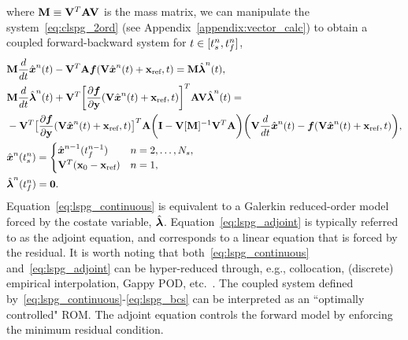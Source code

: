 where
$\massArgnt{n} \equiv \basisspace^T \stweightingMatArgt{n}{t} \basisspace$ is the
mass matrix,
we can manipulate the system~\eqref{eq:clspg_2ord} (see
Appendix~\ref{appendix:vector_calc}) to obtain a coupled forward-backward
system for $t \in  [\timeStartArg{n},\timeEndArg{n}]$,
\begin{align}\label{eq:lspg_continuous} 
&\mass  \frac{d}{dt} \genstateArg{n}{t}  -  \basisspace^T
\stweightingMatArgt{n}{t} \velocity(\veloargsromn) =  \mass \adjointArg{n}{t} , \\
 &\mass \frac{d}{dt} \adjointArg{n}{t}  + \basisspace^T \bigg[\frac{\partial
\velocity}{\partial \stateyDiscrete} (\basisspace \genstateArg{n}{t} +
\stateIntercept,t) \bigg]^T \stweightingMatArgt{n}{t} \basisspace
 \adjointArg{n}{t} = \nonumber \\ &-\basisspace^T \big[
\frac{\partial \velocity}{\partial \stateyDiscrete}(\basisspace \genstateArg{n}{t} +
\stateIntercept,t) \big]^T \stweightingMatArgt{n}{t} \bigg( \mathbf{I} -
\basisspace [\massArgnt{n}]^{-1} \basisspace^T \stweightingMatArgt{n}{t} \bigg)
 \bigg( \basisspace \frac{d}{dt}\genstateArg{n}{t}  -
\velocity(\veloargsromn) \bigg), \label{eq:lspg_adjoint} \\ &
\genstateArg{n}{\timeStartArg{n}} = \begin{cases}
\genstate^{n-1}(\timeEndArg{n-1}) & n=2,\ldots,\nslabs, \label{eq:lspg_bcs1}\\
\basisspace^T(\stateFOMIC - \stateIntercept) & n=1, \end{cases}\\ &
\adjointArg{n}{\timeEndArg{n}} = \boldsymbol 0. \label{eq:lspg_bcs} 
\end{align} 
Equation~\eqref{eq:lspg_continuous} is equivalent to a Galerkin reduced-order
model forced by the costate variable, $\adjoint$.
Equation~\eqref{eq:lspg_adjoint} is typically referred to as the adjoint
equation, and corresponds to a linear equation that is forced by the residual.
It is worth noting that both~\eqref{eq:lspg_continuous}
and~\eqref{eq:lspg_adjoint} can be hyper-reduced through, e.g.,
collocation, (discrete) empirical interpolation, Gappy POD, etc.~\cite{everson_sirovich_gappy,eim,qdeim_drmac}. The
coupled system defined by~\eqref{eq:lspg_continuous}-\eqref{eq:lspg_bcs} can be interpreted as an ``optimally controlled"
ROM. The adjoint equation controls the forward model by enforcing the minimum
residual condition.


